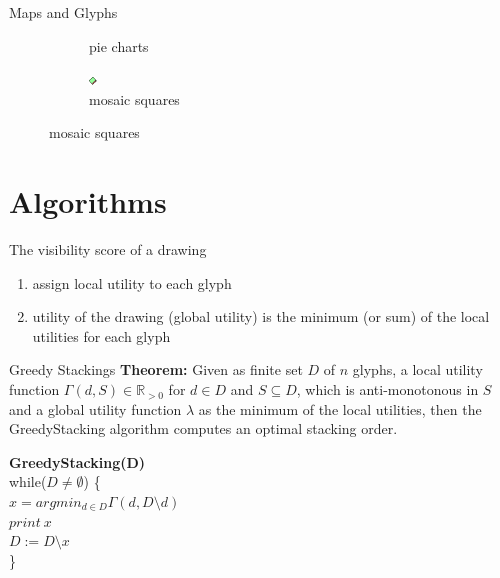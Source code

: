 \documentclass{beamer}
\newcommand\tab[1][1cm]{\hspace*{#1}}
\begin{document}
\begin{frame}{Maps and Glyphs}
\begin{figure}[!b]
\begin{subfigure}[b]{0.45\linewidth}
      \caption{pie charts}
    \end{subfigure}
    \begin{subfigure}[b]{0.45\linewidth}
      \centering
      \includegraphics[width=0.5\linewidth]{assets/symbol_square}
      \caption{mosaic squares}
    \end{subfigure}
  \end{figure}

\end{frame}

\section{Algorithms}

\begin{frame}{The visibility score of a drawing}
    \begin{enumerate}
        \item assign local utility to each glyph
        \item utility of the drawing (global utility) is the minimum (or sum) of the local utilities for each glyph
    \end{enumerate}
\end{frame}

\begin{frame}{Greedy Stackings}
    \textbf{Theorem:} Given as finite set $D$ of $n$ glyphs, a local utility function $\Gamma(d, S) \in \mathbb{R}_{>0}$ for $d\in D$ and $S\subseteq D$, which is anti-monotonous in $S$ and a global utility function $\lambda$ as the minimum of the local utilities, then the GreedyStacking algorithm computes an optimal stacking order.
    
    \pause
    
    \textbf{GreedyStacking(D)}\\
    while($D\neq \emptyset$) \{\\ 
        \tab$x=argmin_{d\in D} \Gamma(d, D\setminus d)$\\
        \tab$print\ x$\\
        \tab$D:=D\setminus x$\\
    \}
\end{frame}
\end{document}
